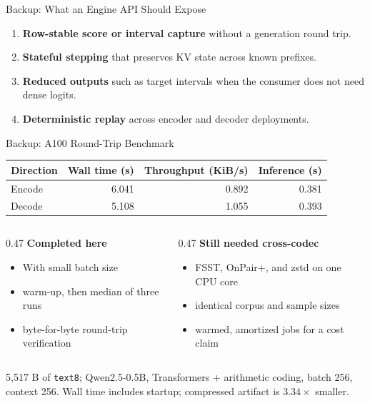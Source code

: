 \begin{frame}{Backup: What an Engine API Should Expose}
  \begin{enumerate}
    \item \textbf{Row-stable score or interval capture} without a generation round trip.
    \vspace{0.35em}
    \item \textbf{Stateful stepping} that preserves KV state across known prefixes.
    \vspace{0.35em}
    \item \textbf{Reduced outputs} such as target intervals when the consumer does not need dense logits.
    \vspace{0.35em}
    \item \textbf{Deterministic replay} across encoder and decoder deployments.
  \end{enumerate}
\end{frame}

\begin{frame}{Backup: A100 Round-Trip Benchmark}
  \begin{table}
    \centering
    \small
    \begin{tabular}{lrrr}
      \toprule
      Direction & Wall time (s) & Throughput (KiB/s) & Inference (s) \\
      \midrule
      Encode & 6.041 & 0.892 & 0.381 \\
      Decode & 5.108 & 1.055 & 0.393 \\
      \bottomrule
    \end{tabular}
  \end{table}

  \vspace{0.35em}
  \begin{columns}[T,onlytextwidth]
    \begin{column}{0.47\textwidth}
      \textbf{Completed here}
      \begin{itemize}
        \item With small batch size
        \item warm-up, then median of three runs
        \item byte-for-byte round-trip verification
      \end{itemize}
    \end{column}
    \hfill
    \begin{column}{0.47\textwidth}
      \textbf{Still needed cross-codec}
      \begin{itemize}
        \item FSST, OnPair+, and zstd on one CPU core
        \item identical corpus and sample sizes
        \item warmed, amortized jobs for a cost claim
      \end{itemize}
    \end{column}
  \end{columns}

  \vfill
  \tiny 5,517 B of \texttt{text8}; Qwen2.5-0.5B, Transformers + arithmetic coding, batch 256, context 256. Wall time includes startup; compressed artifact is $3.34\times$ smaller.
\end{frame}

